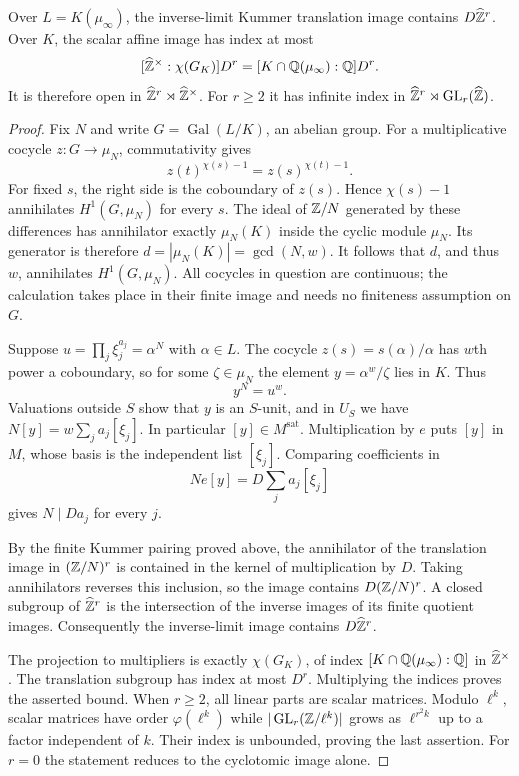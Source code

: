 \begin{proposition}\label{prop:general-kummer-bound}
Over $L=K(\mu_\infty)$, the inverse-limit Kummer translation image
contains $D\widehat{\mathbb Z}^r$. Over $K$, the scalar affine image has
index at most
\[
 [\widehat{\mathbb Z}^\times:\chi(G_K)]D^r
 =[K\cap\mathbb Q(\mu_\infty):\mathbb Q]D^r.
\]
It is therefore open in
$\widehat{\mathbb Z}^r\rtimes\widehat{\mathbb Z}^\times$.
For $r\ge2$ it has infinite index in
$\widehat{\mathbb Z}^r\rtimes\operatorname{GL}_r(\widehat{\mathbb Z})$.
\end{proposition}
\begin{proof}
Fix $N$ and write $G=\operatorname{Gal}(L/K)$, an abelian group.
For a multiplicative cocycle $z:G\to\mu_N$, commutativity gives
\[
 z(t)^{\chi(s)-1}=z(s)^{\chi(t)-1}.
\]
For fixed $s$, the right side is the coboundary of $z(s)$.
Hence $\chi(s)-1$ annihilates $H^1(G,\mu_N)$ for every $s$.
The ideal of $\mathbb Z/N$ generated by these differences has annihilator
exactly $\mu_N(K)$ inside the cyclic module $\mu_N$.
Its generator is therefore $d=|\mu_N(K)|=\gcd(N,w)$.
It follows that $d$, and thus $w$, annihilates $H^1(G,\mu_N)$.
All cocycles in question are continuous; the calculation takes place
in their finite image and needs no finiteness assumption on $G$.

Suppose $u=\prod_j\xi_j^{a_j}=\alpha^N$ with $\alpha\in L$.
The cocycle $z(s)=s(\alpha)/\alpha$ has $w$th power a coboundary,
so for some $\zeta\in\mu_N$ the element
$y=\alpha^w/\zeta$ lies in $K$. Thus
\[
 y^N=u^w.
\]
Valuations outside $S$ show that $y$ is an $S$-unit, and in $U_S$
we have $N[y]=w\sum_j a_j[\xi_j]$. In particular
$[y]\in M^{\mathrm{sat}}$. Multiplication by $e$ puts $[y]$ in
$M$, whose basis is the independent list $[\xi_j]$. Comparing
coefficients in
\[
 N e[y]=D\sum_j a_j[\xi_j]
\]
gives $N\mid Da_j$ for every $j$.

By the finite Kummer pairing proved above, the annihilator of the
translation image in $(\mathbb Z/N)^r$ is contained in the kernel of
multiplication by $D$. Taking annihilators reverses this inclusion,
so the image contains $D(\mathbb Z/N)^r$. A closed subgroup of
$\widehat{\mathbb Z}^r$ is the intersection of the inverse images of its
finite quotient images. Consequently the inverse-limit image
contains $D\widehat{\mathbb Z}^r$.

The projection to multipliers is exactly $\chi(G_K)$, of index
$[K\cap\mathbb Q(\mu_\infty):\mathbb Q]$ in $\widehat{\mathbb Z}^\times$.
The translation subgroup has index at most $D^r$. Multiplying the
indices proves the asserted bound. When $r\ge2$, all linear parts
are scalar matrices. Modulo $\ell^k$, scalar matrices have order
$\varphi(\ell^k)$ while
$|\operatorname{GL}_r(\mathbb Z/\ell^k)|$
grows as $\ell^{r^2k}$ up to a factor independent of $k$.
Their index is unbounded, proving the last assertion. For $r=0$
the statement reduces to the cyclotomic image alone.
\end{proof}
